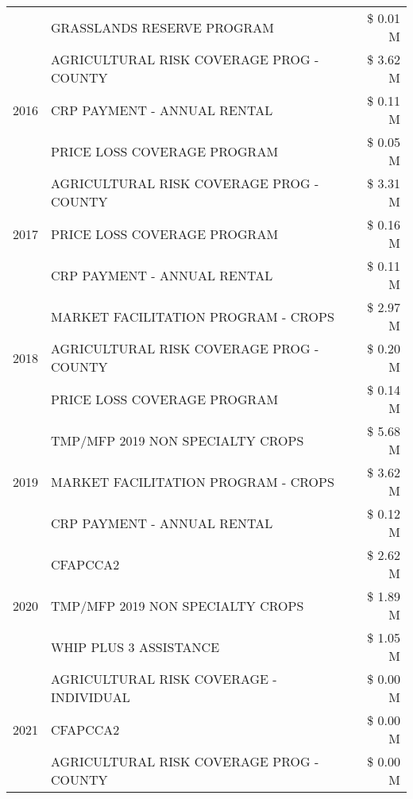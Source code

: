 \begin{tabular}{llr}
 & GRASSLANDS RESERVE PROGRAM & \$ 0.01 M \\
\cline{1-3}
\multirow[t]{3}{*}{2016} & AGRICULTURAL RISK COVERAGE PROG - COUNTY & \$ 3.62 M \\
 & CRP PAYMENT - ANNUAL RENTAL & \$ 0.11 M \\
 & PRICE LOSS COVERAGE PROGRAM & \$ 0.05 M \\
\cline{1-3}
\multirow[t]{3}{*}{2017} & AGRICULTURAL RISK COVERAGE PROG - COUNTY & \$ 3.31 M \\
 & PRICE LOSS COVERAGE PROGRAM & \$ 0.16 M \\
 & CRP PAYMENT - ANNUAL RENTAL & \$ 0.11 M \\
\cline{1-3}
\multirow[t]{3}{*}{2018} & MARKET FACILITATION PROGRAM - CROPS & \$ 2.97 M \\
 & AGRICULTURAL RISK COVERAGE PROG - COUNTY & \$ 0.20 M \\
 & PRICE LOSS COVERAGE PROGRAM & \$ 0.14 M \\
\cline{1-3}
\multirow[t]{3}{*}{2019} & TMP/MFP 2019 NON SPECIALTY CROPS & \$ 5.68 M \\
 & MARKET FACILITATION PROGRAM - CROPS & \$ 3.62 M \\
 & CRP PAYMENT - ANNUAL RENTAL & \$ 0.12 M \\
\cline{1-3}
\multirow[t]{3}{*}{2020} & CFAPCCA2 & \$ 2.62 M \\
 & TMP/MFP 2019 NON SPECIALTY CROPS & \$ 1.89 M \\
 & WHIP PLUS 3 ASSISTANCE & \$ 1.05 M \\
\cline{1-3}
\multirow[t]{3}{*}{2021} & AGRICULTURAL RISK COVERAGE - INDIVIDUAL & \$ 0.00 M \\
 & CFAPCCA2 & \$ 0.00 M \\
 & AGRICULTURAL RISK COVERAGE PROG - COUNTY & \$ 0.00 M \\
\cline{1-3}
\bottomrule
\end{tabular}
